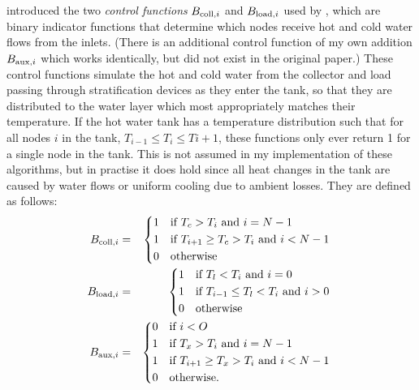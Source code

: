  introduced the two \emph{control functions} $B_{\text{coll}, i}$ and $B_{\text{load}, i}$ used by , which are binary indicator functions that determine which nodes receive hot and cold water flows from the inlets.
(There is an additional control function of my own addition $B_{\text{aux}, i}$ which works identically, but did not exist in the original paper.)
These control functions simulate the hot and cold water from the collector and load passing through stratification devices as they enter the tank, so that they are distributed to the water layer which most appropriately matches their temperature.
If the hot water tank has a temperature distribution such that for all nodes $i$ in the tank, $T_{i-1} \le T_i \le T{i+1}$, these functions only ever return 1 for a single node in the tank.
This is not assumed in my implementation of these algorithms, but in practise it does hold since all heat changes in the tank are caused by water flows or uniform cooling due to ambient losses.
They are defined as follows:
\begin{eqnarray}
   \label{eq:B-coll}
   \B{coll} &=& \begin{dcases*}
      1 & if $T_c > T_i$ and $i = N-1$ \\
      1 & if $T_{i+1} \ge T_c > T_i$ and $i < N-1$ \\
      0 & otherwise
   \end{dcases*}
   \\
   \label{eq:B-load}
   \B{load} &=& \begin{dcases*}
      1 & if $T_l < T_i$ and $i = 0$ \\
      1 & if $T_{i-1} \le T_l < T_i$ and $i > 0$ \\
      0 & otherwise
   \end{dcases*}
   \\
   \label{eq:B-aux}
   \B{aux} &=& \begin{dcases*}
      0 & if $i < O$ \\
      1 & if $T_x > T_i$ and $i = N-1$ \\
      1 & if $T_{i+1} \ge T_x > T_i$ and $i < N-1$ \\
      0 & otherwise.
   \end{dcases*}
\end{eqnarray}

